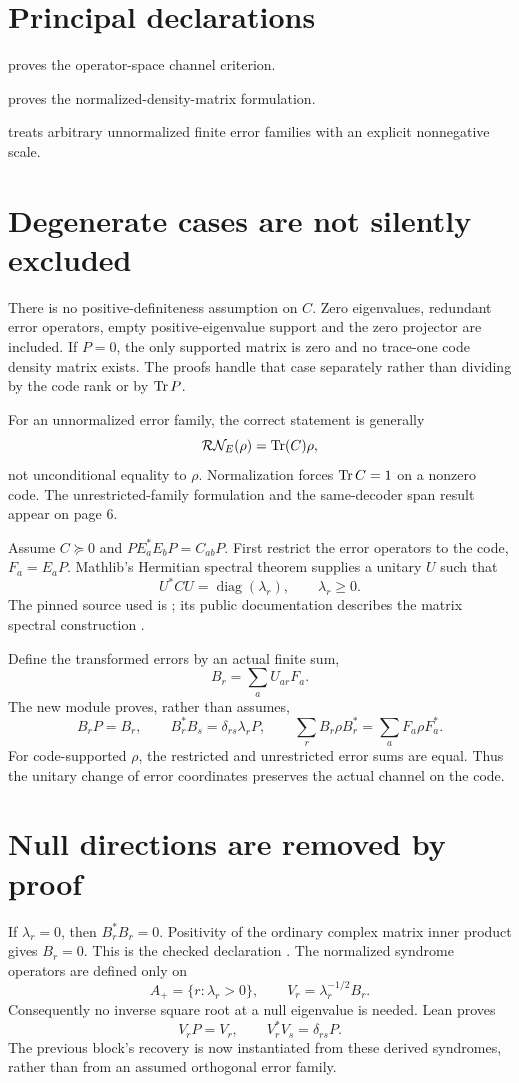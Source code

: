 \documentclass[10pt,letterpaper]{article}
\newcommand{\pageheading}[2]{\vspace*{2pt}{\small\color{ink}\textsc{#1}}\par\vspace{2pt}{\Large\bfseries #2}\par\vspace{4pt}}
\begin{document}
\section*{Principal declarations}
 proves the operator-space channel criterion.\par
{} proves the normalized-density-matrix formulation.\par
{} treats arbitrary unnormalized finite error families with an explicit nonnegative scale.

\section*{Degenerate cases are not silently excluded}
There is no positive-definiteness assumption on $C$. Zero eigenvalues, redundant error operators, empty positive-eigenvalue support and the zero projector are included. If $P=0$, the only supported matrix is zero and no trace-one code density matrix exists. The proofs handle that case separately rather than dividing by the code rank or by $\operatorname{Tr} P$.

For an unnormalized error family, the correct statement is generally
\[
\mathcal R\mathcal N_E(\rho)=\operatorname{Tr}(C)\rho,
\]
not unconditional equality to $\rho$. Normalization forces $\operatorname{Tr} C=1$ on a nonzero code. The unrestricted-family formulation and the same-decoder span result appear on page 6.

\newpage
\pageheading{Sufficiency}{From Gram data to an actual total recovery}
Assume $C\succeq0$ and $PE_a^*E_bP=C_{ab}P$. First restrict the error operators to the code, $F_a=E_aP$. Mathlib's Hermitian spectral theorem supplies a unitary $U$ such that
\[
U^*CU=\operatorname{diag}(\lambda_r),\qquad \lambda_r\ge0.
\]
The pinned source used is ; its public documentation describes the matrix spectral construction \cite{spectral}.

Define the transformed errors by an actual finite sum,
\[
B_r=\sum_a U_{ar}F_a.
\]
The new module proves, rather than assumes,
\[
B_rP=B_r,\qquad B_r^*B_s=\delta_{rs}\lambda_rP,
\qquad \sum_rB_r\rho B_r^*=\sum_aF_a\rho F_a^*.
\]
For code-supported $\rho$, the restricted and unrestricted error sums are equal. Thus the unitary change of error coordinates preserves the actual channel on the code.

\section*{Null directions are removed by proof}
If $\lambda_r=0$, then $B_r^*B_r=0$. Positivity of the ordinary complex matrix inner product gives $B_r=0$. This is the checked declaration . The normalized syndrome operators are defined only on
\[
A_+=\{r:\lambda_r>0\},\qquad V_r=\lambda_r^{-1/2}B_r.
\]
Consequently no inverse square root at a null eigenvalue is needed. Lean proves
\[
V_rP=V_r,\qquad V_r^*V_s=\delta_{rs}P.
\]
The previous block's recovery is now instantiated from these derived syndromes, rather than from an assumed orthogonal error family.
\end{document}

